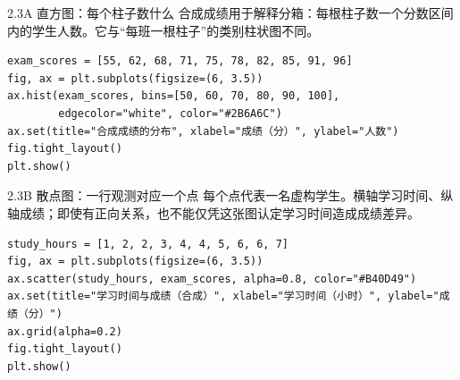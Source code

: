\begin{frame}[fragile]{2.3A 直方图：每个柱子数什么}
\small 合成成绩用于解释分箱：每根柱子数一个分数区间内的学生人数。它与“每班一根柱子”的类别柱状图不同。
\medskip
\begin{lstlisting}
exam_scores = [55, 62, 68, 71, 75, 78, 82, 85, 91, 96]
fig, ax = plt.subplots(figsize=(6, 3.5))
ax.hist(exam_scores, bins=[50, 60, 70, 80, 90, 100],
        edgecolor="white", color="#2B6A6C")
ax.set(title="合成成绩的分布", xlabel="成绩（分）", ylabel="人数")
fig.tight_layout()
plt.show()
\end{lstlisting}
\end{frame}

\begin{frame}[fragile]{2.3B 散点图：一行观测对应一个点}
\small 每个点代表一名虚构学生。横轴学习时间、纵轴成绩；即使有正向关系，也不能仅凭这张图认定学习时间造成成绩差异。
\medskip
\begin{lstlisting}
study_hours = [1, 2, 2, 3, 4, 4, 5, 6, 6, 7]
fig, ax = plt.subplots(figsize=(6, 3.5))
ax.scatter(study_hours, exam_scores, alpha=0.8, color="#B40D49")
ax.set(title="学习时间与成绩（合成）", xlabel="学习时间（小时）", ylabel="成绩（分）")
ax.grid(alpha=0.2)
fig.tight_layout()
plt.show()
\end{lstlisting}
\end{frame}
